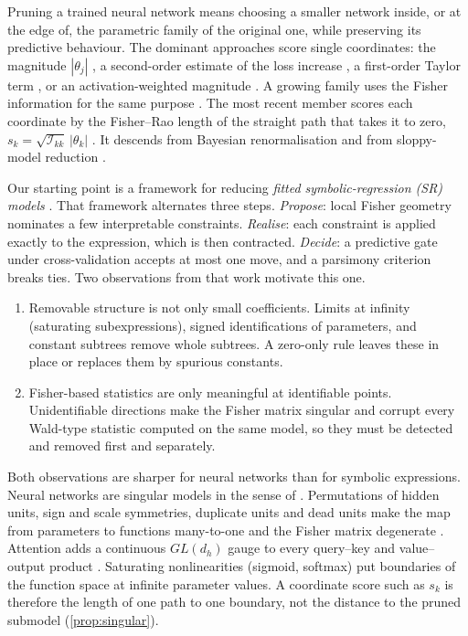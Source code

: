\documentclass[11pt,a4paper]{article}
\theoremstyle{definition}
\newcommand{\Fis}{\mathcal{I}}
\begin{document}
Pruning a trained neural network means choosing a smaller network inside, or at the
edge of, the parametric family of the original one, while preserving its predictive
behaviour. The dominant approaches score single coordinates: the magnitude
$|\theta_j|$ \citep{han2015learning}, a second-order estimate of the loss increase
\citep{lecun1990obd,hassibi1993obs,singh2020woodfisher}, a first-order Taylor term
\citep{molchanov2017taylor}, or an activation-weighted magnitude
\citep{sun2024wanda}. A growing family uses the Fisher information for the same
purpose \citep{theis2018fisher,liu2021groupfisher,kwon2022fast}. The most recent
member scores each coordinate by the Fisher--Rao length of the straight path that
takes it to zero, $s_k=\sqrt{\Fis_{kk}}\,|\theta_k|$ \citep{berman2026fdist}. It
descends from Bayesian renormalisation \citep{berman2023,howard2025} and from
sloppy-model reduction \citep{transtrum2011geometry,machta2013,transtrum2014}.

Our starting point is a framework for reducing \emph{fitted symbolic-regression (SR)
models} \citep{guidetti2026emergent}. That framework alternates three steps.
\emph{Propose}: local Fisher geometry nominates a few interpretable constraints.
\emph{Realise}: each constraint is applied exactly to the expression, which is then
contracted. \emph{Decide}: a predictive gate under cross-validation accepts at most
one move, and a parsimony criterion breaks ties. Two observations from that work
motivate this one.
\begin{enumerate}[label=(\roman*)]
\item Removable structure is not only small coefficients. Limits at infinity
(saturating subexpressions), signed identifications of parameters, and constant
subtrees remove whole subtrees. A zero-only rule leaves these in place or replaces
them by spurious constants.
\item Fisher-based statistics are only meaningful at identifiable points. Unidentifiable
directions make the Fisher matrix singular and corrupt every Wald-type statistic
computed on the same model, so they must be detected and removed first and separately.
\end{enumerate}

Both observations are sharper for neural networks than for symbolic expressions.
Neural networks are singular models in the sense of \citet{watanabe2009algebraic}.
Permutations of hidden units, sign and scale symmetries, duplicate units and dead
units make the map from parameters to functions many-to-one and the Fisher matrix
degenerate
\citep{sussmann1992uniqueness,fukumizu1996regularity,fukumizu2000local,amari2006singularities,wei2023singular}.
Attention adds a continuous $GL(d_h)$ gauge to every query--key and value--output
product \citep{elhage2021framework}. Saturating nonlinearities (sigmoid, softmax) put
boundaries of the function space at infinite parameter values. A coordinate score
such as $s_k$ is therefore the length of one path to one boundary, not the distance
to the pruned submodel (\cref{prop:singular}).
\end{document}
